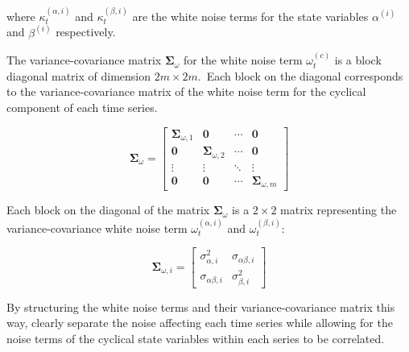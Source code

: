     where $\kappa_{t}^{(\alpha,i)}$ and $\kappa_{t}^{(\beta,i)}$ are the white noise terms for the state variables
    $\alpha^{(i)}$ and $\beta^{(i)}$ respectively.

    The variance-covariance matrix $\bm{\Sigma}_{\omega}$ for the white noise term $\omega_t^{(c)}$ is a block diagonal
    matrix of dimension $2m \times 2m$.\ Each block on the diagonal corresponds to the variance-covariance matrix of the
    white noise term for the cyclical component of each time series.

    \begin{equation}
        \bm{\Sigma}_{\omega} =
            \left[
                \begin{array}{cccc}
                    \bm{\Sigma}_{\omega, 1} & \mathbf{0} & \cdots & \mathbf{0} \\
                    \mathbf{0} & \mathbf{\Sigma}_{\omega, 2} & \cdots & \mathbf{0} \\
                    \vdots & \vdots & \ddots & \vdots \\
                    \mathbf{0} & \mathbf{0} & \cdots & \mathbf{\Sigma}_{\omega, m}
                \end{array}
            \right]
        \label{eq:cyclical_covariance}
    \end{equation}

    Each block on the diagonal of the matrix $\bm{\Sigma}_{\omega}$ is a $2 \times 2$ matrix representing the variance-covariance
    white noise term $\omega_t^{(\alpha, i)}$ and $\omega_t^{(\beta, i)}$:

    \begin{equation}
        \bm{\Sigma}_{\omega, i} =
            \left[
                \begin{array}{cc}
                    \sigma_{\alpha, i}^2    & \sigma_{\alpha\beta, i} \\
                    \sigma_{\alpha\beta, i} & \sigma_{\beta, i}^2
                \end{array}
            \right]
        \label{eq:cyclical_covariance_block}
    \end{equation}

    By structuring the white noise terms and their variance-covariance matrix this way,
    clearly separate the noise affecting each time series while allowing for the noise terms of the cyclical
    state variables within each series to be correlated.










